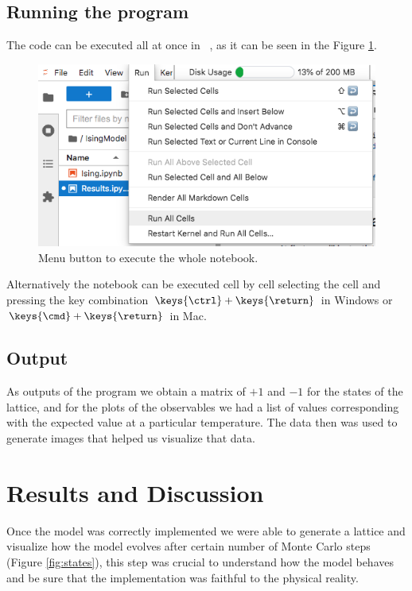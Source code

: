\documentclass[
    10pt,
    journal,
    compsoc,
    english
]{IEEEtran}
\begin{document}
\subsection{Running the program}
The code can be executed all at once in \ , as it can be seen in the Figure \ref{fig:menu}.

\begin{figure}
    \centering
    \includegraphics[width=0.75\columnwidth]{img/menu.png}
    \caption{Menu button to execute the whole notebook.}
    \label{fig:menu}
\end{figure}

Alternatively the notebook can be executed cell by cell selecting the cell and pressing the key combination $\keys{\ctrl}+\keys{\return}$ in Windows or $\keys{\cmd}+\keys{\return}$ in Mac.

\subsection{Output}
As outputs of the program we obtain a matrix of $+1$ and $-1$ for the states of the lattice, and for the plots of the observables we had a list of values corresponding with the expected value at a particular temperature. The data then was used to generate images that helped us visualize that data.

\section{Results and Discussion}
Once the model was correctly implemented we were able to generate a lattice and visualize how the model evolves after certain number of Monte Carlo steps (Figure \ref{fig:states}), this step was crucial to understand how the model behaves and be sure that the implementation was faithful to the physical reality.
\end{document}
